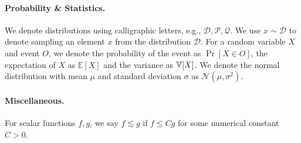 \paragraph{Probability \& Statistics.}
We denote distributions using calligraphic letters, e.g., $\mathcal{D}, \mathcal{P}, \mathcal{Q}$. We use $x \sim \mathcal{D}$ to denote sampling an element $x$ from the distribution $\mathcal{D}$. For a random variable $X$ and event $O$, we denote the probability of the event as $\operatorname{Pr}[X\in O]$, the expectation of $X$ as $\mathbb{E}[X]$ and the variance as $\mathbb{V}[X]$. We denote the normal distribution with mean $\mu$ and standard deviation $\sigma$ as $\mathcal{N}\left(\mu, \sigma^2\right)$.

\paragraph{Miscellaneous.}
For scalar functions $f, g$, we say $f \lesssim g$ if $f \leq C g$ for some numerical constant $C>0$. 
